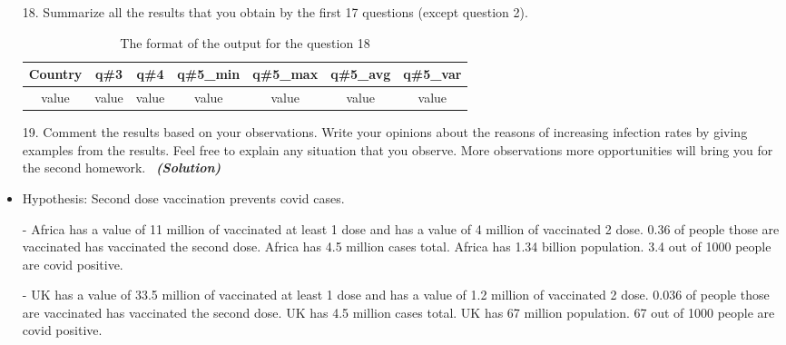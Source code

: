 \documentclass[a4 paper]{article}
\newcommand{\solution}{~\newline\textbf{\textit{(Solution)}} }
\newcommand{\0}{\mathbf{0}}
\begin{document}
\begin{itemize}
\begin{table}[ht]
\begin{tabular}{c c c c}
			\hline %
		\end{tabular}\label{table:nonlin}%
	\end{table}
	\item[18. ] Summarize all the results that you obtain by the first 17 questions (except question 2). 
	\begin{table}[ht]
		\caption{The format of the output for the question 18} %
		\centering  %
		\begin{tabular}{c c c c c c c}%
			\hline\hline       %
			Country & q\#3 & q\#4 & q\#5\_min &  q\#5\_max & q\#5\_avg &  q\#5\_var  \\ 
			[0.5ex]%
			\hline      %
			 value & value & value & value & value & value & value\\%

			\hline %
		\end{tabular}\label{table:nonlin}%
	\end{table}
	\newline
	\newline
	\item[19. ] Comment the results based on your observations. Write your opinions about the reasons of increasing infection rates by giving examples from the results. Feel free to explain any situation that you observe. More observations more opportunities will bring you for the second homework. 
	\solution 
	\item Hypothesis: Second dose vaccination prevents covid cases. 
	\item[-] Africa has a value of 11 million of vaccinated at least 1 dose \newline
	and has a value of 4 million of vaccinated 2 dose. 0.36 of people those are vaccinated \newline
	has vaccinated the second dose.\newline
	Africa has 4.5 million cases total.
	Africa has 1.34 billion population. 3.4 out of 1000 people are covid positive.
	
	\item[-]  UK has a value of 33.5 million of vaccinated at least 1 dose \newline
	and has a value of 1.2 million of vaccinated 2 dose. 0.036 of people those are vaccinated \newline
	has vaccinated the second dose.
	UK has 4.5 million cases total.
	UK has 67 million population. 67 out of 1000 people are covid positive.\newline
	

\end{itemize}
\end{document}
